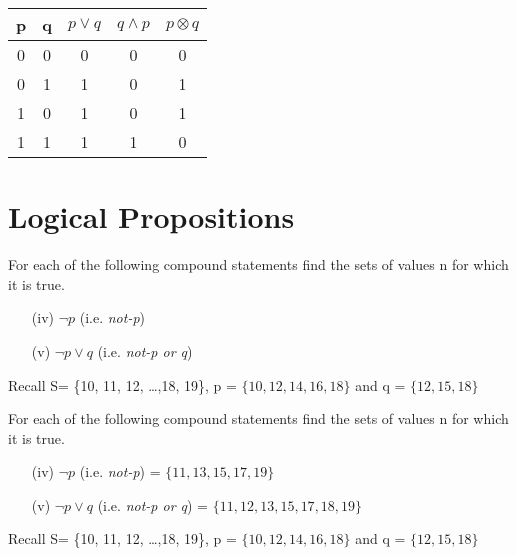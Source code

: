 \documentclass{beamer}
\begin{document}
\begin{frame}



\begin{center}
\begin{tabular}{|c|c|c|c|c|}
\hline
p & q & $p \vee q$ & $q \wedge p$ & $p \otimes q$ \\
\hline
0 & 0 & 0 & 0 & 0 \\
0 & 1 & 1 & 0 & 1\\
1 & 0 & 1 & 0 & 1 \\
1 & 1 & 1 & 1 & 0\\
\hline
\end{tabular}
\end{center}



\section{Logical Propositions}

For each of the following compound statements find the sets of values n for which it is true. %
\begin{itemize}
\item[(iv)] $\neg p $  (i.e. \textit{not-p}) %
\item[(v)] $\neg p \vee q$  (i.e. \textit{not-p or q}) %
\end{itemize}
Recall S= \{10, 11, 12, \ldots ,18, 19\}, p = $\{10,12,14,16,18\}$  and q = $\{12,15,18\}$

For each of the following compound statements find the sets of values n for which it is true. %
\begin{itemize}
\item[(iv)] $\neg p $  (i.e. \textit{not-p}) = $\{ 11, 13, 15, 17, 19\}$
\item[(v)] $\neg p \vee q$  (i.e. \textit{not-p or q}) =  $\{11, 12, 13, 15, 17, 18, 19\}$
\end{itemize}

Recall S= \{10, 11, 12, \ldots ,18, 19\}, p = $\{10,12,14,16,18\}$  and q = $\{12,15,18\}$




\end{frame}
\end{document}
